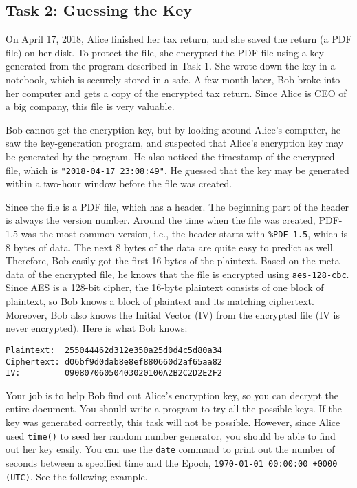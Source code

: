 \subsection{Task 2: Guessing the Key}


On April 17, 2018, Alice finished her tax return, and she
saved the return (a PDF file) on her disk. To protect the file, she encrypted the PDF file 
using a key generated from the program described in Task 1. She wrote down the key
in a notebook, which is securely stored in a safe. 
A few month later, Bob broke into her computer and gets a copy of the encrypted 
tax return. Since Alice is CEO of a big company, this file is very valuable. 


Bob cannot get the encryption key, but by looking around Alice's computer, he 
saw the key-generation program, and suspected that Alice's encryption key may
be generated by the program. He also noticed the timestamp of the encrypted file, which
is \texttt{"2018-04-17 23:08:49"}. He guessed that the 
key may be generated within a two-hour window before the file was 
created. 


Since the file is a PDF file, which has a header. The 
beginning part of the header is always the version number. Around 
the time when the file was created, PDF-1.5 was the most common version,
i.e., the header starts with \texttt{\%PDF-1.5}, which 
is 8 bytes of data. The next 8 bytes of the data are quite easy to 
predict as well. Therefore, Bob easily got the first 16 bytes of the plaintext.
Based on the meta data of the encrypted file, he knows that 
the file is encrypted using \texttt{aes-128-cbc}. Since AES is a 128-bit cipher, the 16-byte
plaintext consists of one block of plaintext, so Bob knows a block of plaintext and its
matching ciphertext. Moreover, Bob also knows 
the Initial Vector (IV) from the encrypted file (IV is never encrypted).
Here is what Bob knows:


\begin{lstlisting}
Plaintext:  255044462d312e350a25d0d4c5d80a34
Ciphertext: d06bf9d0dab8e8ef880660d2af65aa82
IV:         09080706050403020100A2B2C2D2E2F2 
\end{lstlisting}
 

Your job is to help Bob find out Alice's encryption key, so you can decrypt the entire
document. You should write a program
to try all the possible keys. If the key was generated correctly, this task will not be
possible. However, since Alice used \texttt{time()} to seed her random number generator, you
should be able to find out her key easily. You can use the \texttt{date} command to print out
the number of seconds between
a specified time and the Epoch, \texttt{1970-01-01 00:00:00 +0000 (UTC)}.
See the following example. 

